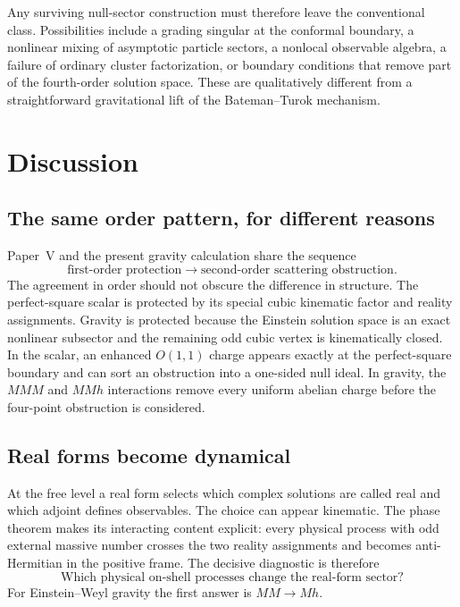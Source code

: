 \documentclass[11pt]{article}
\theoremstyle{definition}
\theoremstyle{remark}
\begin{document}
Any surviving null-sector construction must therefore leave the
conventional class.  Possibilities include a grading singular at the
conformal boundary, a nonlinear mixing of asymptotic particle sectors, a
nonlocal observable algebra, a failure of ordinary cluster
factorization, or boundary conditions that remove part of the
fourth-order solution space.  These are qualitatively different from a
straightforward gravitational lift of the Bateman--Turok mechanism.

\section{Discussion}\label{sec:discussion}

\subsection{The same order pattern, for different reasons}

Paper~V and the present gravity calculation share the sequence
\begin{equation}
\text{first-order protection}\longrightarrow
\text{second-order scattering obstruction}.
\end{equation}
The agreement in order should not obscure the difference in structure.
The perfect-square scalar is protected by its special cubic kinematic
factor and reality assignments.  Gravity is protected because the
Einstein solution space is an exact nonlinear subsector and the remaining
odd cubic vertex is kinematically closed.  In the scalar, an enhanced
$O(1,1)$ charge appears exactly at the perfect-square boundary and can
sort an obstruction into a one-sided null ideal.  In gravity, the $MMM$
and $MMh$ interactions remove every uniform abelian charge before the
four-point obstruction is considered.

\subsection{Real forms become dynamical}

At the free level a real form selects which complex solutions are called
real and which adjoint defines observables.  The choice can appear
kinematic.  The phase theorem makes its interacting content explicit:
every physical process with odd external massive number crosses the two
reality assignments and becomes anti-Hermitian in the positive frame.
The decisive diagnostic is therefore
\begin{equation}
\boxed{\text{Which physical on-shell processes change the real-form
sector?}}
\end{equation}
For Einstein--Weyl gravity the first answer is $MM\to Mh$.
\end{document}
